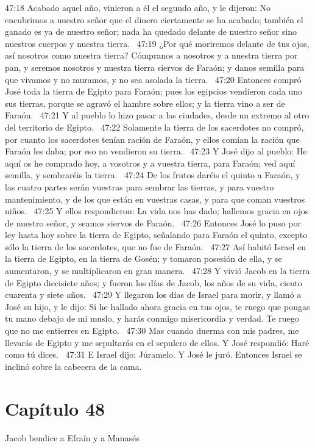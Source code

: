 47:18 Acabado aquel año, vinieron a él el segundo año, y le dijeron: No encubrimos a nuestro señor que el dinero ciertamente se ha acabado; también el ganado es ya de nuestro señor; nada ha quedado delante de nuestro señor sino nuestros cuerpos y nuestra tierra.  
47:19 ¿Por qué moriremos delante de tus ojos, así nosotros como nuestra tierra? Cómpranos a nosotros y a nuestra tierra por pan, y seremos nosotros y nuestra tierra siervos de Faraón; y danos semilla para que vivamos y no muramos, y no sea asolada la tierra.  
47:20 Entonces compró José toda la tierra de Egipto para Faraón; pues los egipcios vendieron cada uno sus tierras, porque se agravó el hambre sobre ellos; y la tierra vino a ser de Faraón.  
47:21 Y al pueblo lo hizo pasar a las ciudades, desde un extremo al otro del territorio de Egipto.  
47:22 Solamente la tierra de los sacerdotes no compró, por cuanto los sacerdotes tenían ración de Faraón, y ellos comían la ración que Faraón les daba; por eso no vendieron su tierra.  
47:23 Y José dijo al pueblo: He aquí os he comprado hoy, a vosotros y a vuestra tierra, para Faraón; ved aquí semilla, y sembraréis la tierra.  
47:24 De los frutos daréis el quinto a Faraón, y las cuatro partes serán vuestras para sembrar las tierras, y para vuestro mantenimiento, y de los que están en vuestras casas, y para que coman vuestros niños.  
47:25 Y ellos respondieron: La vida nos has dado; hallemos gracia en ojos de nuestro señor, y seamos siervos de Faraón.  
47:26 Entonces José lo puso por ley hasta hoy sobre la tierra de Egipto, señalando para Faraón el quinto, excepto sólo la tierra de los sacerdotes, que no fue de Faraón.  
47:27 Así habitó Israel en la tierra de Egipto, en la tierra de Gosén; y tomaron posesión de ella, y se aumentaron, y se multiplicaron en gran manera.  
47:28 Y vivió Jacob en la tierra de Egipto diecisiete años; y fueron los días de Jacob, los años de su vida, ciento cuarenta y siete años.  
47:29 Y llegaron los días de Israel para morir, y llamó a José su hijo, y le dijo: Si he hallado ahora gracia en tus ojos, te ruego que pongas tu mano debajo de mi muslo, y harás conmigo misericordia y verdad. Te ruego que no me entierres en Egipto.  
47:30 Mas cuando duerma con mis padres, me llevarás de Egipto y me sepultarás en el sepulcro de ellos. Y José respondió: Haré como tú dices.  
47:31 E Israel dijo: Júramelo. Y José le juró. Entonces Israel se inclinó sobre la cabecera de la cama.  
\section*{Capítulo 48}
Jacob bendice a Efraín y a Manasés  

